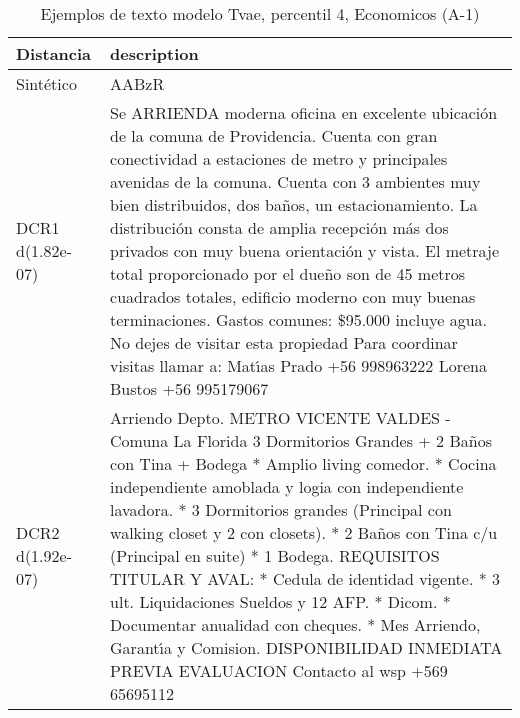 \begin{table}[H]
\centering
\fontsize{10}{14}\selectfont
\caption{Ejemplos de texto modelo Tvae, percentil 4, Economicos (A-1)}
\label{table-example-economicos-a-1-tvae-4p-text}
\begin{tabular}{|l|m{35em}|}
\hline
\rowcolor[gray]{0.8}
Distancia & description \\
\hline Sintético & AABzR \\
\hline DCR1 d(1.82e-07) & Se ARRIENDA moderna oficina en excelente ubicaci\'on de la comuna de Providencia. Cuenta con gran conectividad a estaciones de metro y principales avenidas de la comuna. Cuenta con 3 ambientes muy bien distribuidos, dos ba\~nos, un estacionamiento. La distribuci\'on consta de amplia recepci\'on m\'as dos privados con muy buena orientaci\'on y vista. El metraje total proporcionado por el due\~no son de 45 metros cuadrados totales, edificio moderno con muy buenas terminaciones. Gastos comunes: \$95.000 incluye agua. No dejes de visitar esta propiedad  Para coordinar visitas llamar a: Mat{\'\i}as Prado +56 998963222 Lorena Bustos +56 995179067 \\
\hline DCR2 d(1.92e-07) & Arriendo Depto. METRO VICENTE VALDES - Comuna La Florida  3 Dormitorios Grandes + 2 Ba\~nos con Tina + Bodega  * Amplio living comedor.  * Cocina independiente amoblada y logia con independiente lavadora.  * 3 Dormitorios grandes (Principal con walking closet y 2 con closets).  * 2 Ba\~nos con Tina c/u (Principal en suite) * 1 Bodega.   REQUISITOS TITULAR Y AVAL:  * Cedula de identidad vigente. * 3 ult. Liquidaciones Sueldos y 12 AFP.  * Dicom.  * Documentar anualidad con cheques.  * Mes Arriendo, Garant{\'\i}a y Comision.   DISPONIBILIDAD INMEDIATA PREVIA EVALUACION   Contacto al wsp +569 65695112 \\
\hline
\end{tabular}
\end{table}
